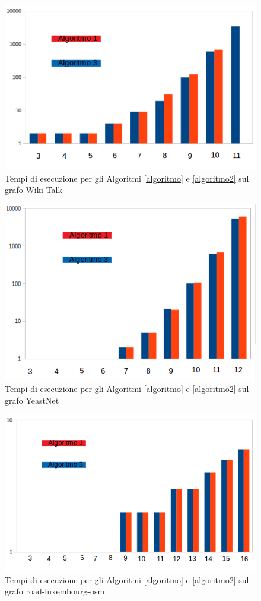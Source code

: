 \begin{figure}[htbp]
	\includegraphics[width=\textwidth]{capitolo4/tempiWIKI}
	\caption{Tempi di esecuzione per gli Algoritmi \ref{algoritmo} e \ref{algoritmo2} sul grafo Wiki-Talk}
	\label{Tempi:1}
\end{figure}
\begin{figure}[htbp]
	\includegraphics[width=\textwidth]{capitolo4/tempiYEAST}
	\caption{Tempi di esecuzione per gli Algoritmi \ref{algoritmo} e \ref{algoritmo2} sul grafo YeastNet}
	\label{Tempi:2}
\end{figure}
\begin{figure}[htbp]
	\includegraphics[width=\textwidth]{capitolo4/tempiROAD}
	\caption{Tempi di esecuzione per gli Algoritmi \ref{algoritmo} e \ref{algoritmo2} sul grafo road-luxembourg-osm}
	\label{Tempi:3}
\end{figure}
